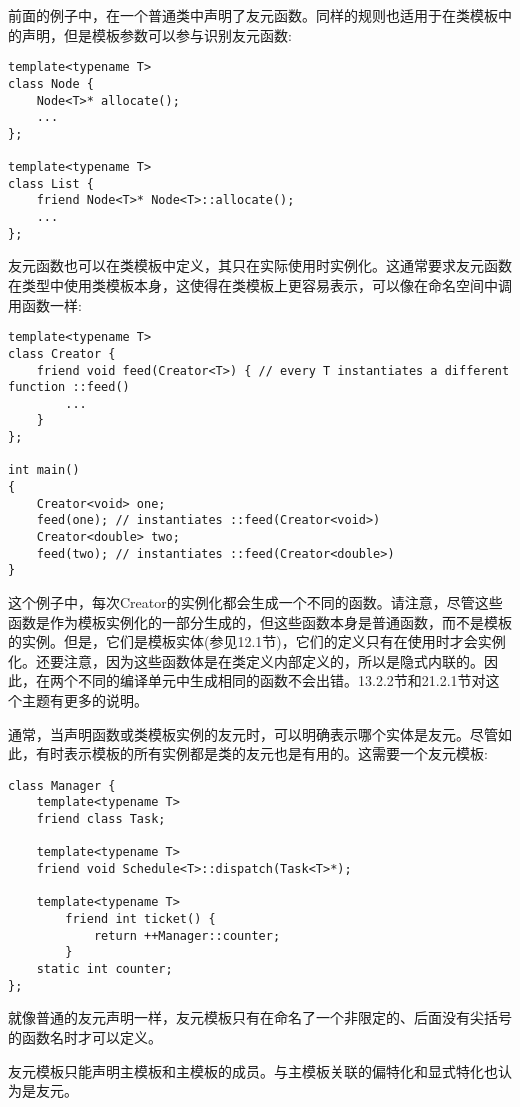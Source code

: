 前面的例子中，在一个普通类中声明了友元函数。同样的规则也适用于在类模板中的声明，但是模板参数可以参与识别友元函数:

\begin{lstlisting}[style=styleCXX]
template<typename T>
class Node {
	Node<T>* allocate();
	...
};

template<typename T>
class List {
	friend Node<T>* Node<T>::allocate();
	...
};
\end{lstlisting}

友元函数也可以在类模板中定义，其只在实际使用时实例化。这通常要求友元函数在类型中使用类模板本身，这使得在类模板上更容易表示，可以像在命名空间中调用函数一样:

\begin{lstlisting}[style=styleCXX]
template<typename T>
class Creator {
	friend void feed(Creator<T>) { // every T instantiates a different function ::feed()
		...
	}
};

int main()
{
	Creator<void> one;
	feed(one); // instantiates ::feed(Creator<void>)
	Creator<double> two;
	feed(two); // instantiates ::feed(Creator<double>)
}
\end{lstlisting}

这个例子中，每次Creator的实例化都会生成一个不同的函数。请注意，尽管这些函数是作为模板实例化的一部分生成的，但这些函数本身是普通函数，而不是模板的实例。但是，它们是模板实体(参见12.1节)，它们的定义只有在使用时才会实例化。还要注意，因为这些函数体是在类定义内部定义的，所以是隐式内联的。因此，在两个不同的编译单元中生成相同的函数不会出错。13.2.2节和21.2.1节对这个主题有更多的说明。


通常，当声明函数或类模板实例的友元时，可以明确表示哪个实体是友元。尽管如此，有时表示模板的所有实例都是类的友元也是有用的。这需要一个友元模板:

\begin{lstlisting}[style=styleCXX]
class Manager {
	template<typename T>
	friend class Task;
	
	template<typename T>
	friend void Schedule<T>::dispatch(Task<T>*);
	
	template<typename T>
		friend int ticket() {
			return ++Manager::counter;
		}
	static int counter;
};
\end{lstlisting}

就像普通的友元声明一样，友元模板只有在命名了一个非限定的、后面没有尖括号的函数名时才可以定义。

友元模板只能声明主模板和主模板的成员。与主模板关联的偏特化和显式特化也认为是友元。








